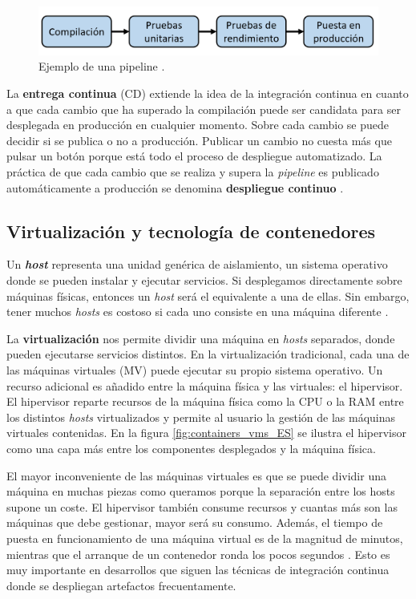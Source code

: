 \documentclass[11pt,spanish,listoffigures]{tfgetsinf}
\begin{document}
\begin{figure}[h]
\centering
\includegraphics[scale=0.6]{pipeline_ES}
\caption{Ejemplo de una pipeline \cite{Newman2015a}.}
\end{figure}

La \textbf{entrega continua} (CD) extiende la idea de la integración continua en cuanto a que cada cambio que ha superado la compilación puede ser candidata para ser desplegada en producción en cualquier momento. Sobre cada cambio se puede decidir si se publica o no a producción. Publicar un cambio no cuesta más que pulsar un botón porque está todo el proceso de despliegue automatizado. La práctica de que cada cambio que se realiza y supera la \textit{pipeline} es publicado automáticamente a producción se denomina \textbf{despliegue continuo} \cite{Fowler2013}.

\subsection{Virtualización y tecnología de contenedores}

Un \textbf{\textit{host}} representa una unidad genérica de aislamiento, un sistema operativo donde se pueden instalar y ejecutar servicios. Si desplegamos directamente sobre máquinas físicas, entonces un \textit{host} será el equivalente a una de ellas. Sin embargo, tener muchos \textit{hosts} es costoso si cada uno consiste en una máquina diferente \cite{Newman2015a}.

La \textbf{virtualización} nos permite dividir una máquina en \textit{hosts} separados, donde pueden ejecutarse servicios distintos. En la virtualización tradicional, cada una de las máquinas virtuales (MV) puede ejecutar su propio sistema operativo. Un recurso adicional es añadido entre la máquina física y las virtuales: el hipervisor. El hipervisor reparte recursos de la máquina física como la CPU o la RAM entre los distintos \textit{hosts} virtualizados y permite al usuario la gestión de las máquinas virtuales contenidas. En la figura \ref{fig:containers_vms_ES} se ilustra el hipervisor como una capa más entre los componentes desplegados y la máquina física.

El mayor inconveniente de las máquinas virtuales es que se puede dividir una máquina en muchas piezas como queramos porque la separación entre los hosts supone un coste. El hipervisor también consume recursos y cuantas más son las máquinas que debe gestionar, mayor será su consumo. Además, el tiempo de puesta en funcionamiento de una máquina virtual es de la magnitud de minutos, mientras que el arranque de un contenedor ronda los pocos segundos \cite{Dua2014}. Esto es muy importante en desarrollos que siguen las técnicas de integración continua donde se despliegan artefactos frecuentamente. 
\end{document}
